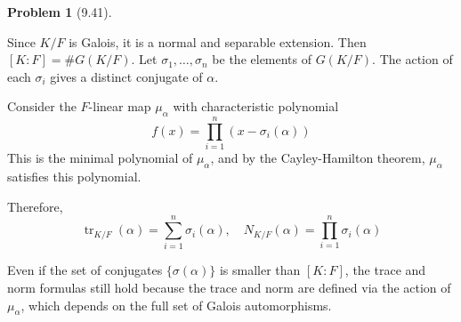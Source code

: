 \documentclass[12pt]{article}
\theoremstyle{definition}
\newtheorem{problem}{Problem}
\DeclareMathOperator{\tr}{tr}
\begin{document}
\begin{problem}[9.41]
\begin{enumerate}[label=(\alph*)]
        \begin{solution}
            Since $K/F$ is Galois, it is a normal and separable extension. Then $[K : F] = \#G(K/F)$. Let $\sigma_1, \dots, \sigma_n$ be the elements of $G(K/F)$. The action of each $\sigma_i$ gives a distinct conjugate of $\alpha$.

            Consider the $F$-linear map $\mu_\alpha$ with characteristic polynomial
            \[
                f(x) = \prod_{i=1}^{n} (x - \sigma_i(\alpha))
            \]
            This is the minimal polynomial of $\mu_\alpha$, and by the Cayley-Hamilton theorem, $\mu_\alpha$ satisfies this polynomial.

            Therefore,
            \[
                \tr_{K/F}(\alpha) = \sum_{i=1}^n \sigma_i(\alpha), \quad N_{K/F}(\alpha) = \prod_{i=1}^n \sigma_i(\alpha)
            \]

            Even if the set of conjugates $\{ \sigma(\alpha) \}$ is smaller than $[K:F]$, the trace and norm formulas still hold because the trace and norm are defined via the action of $\mu_\alpha$, which depends on the full set of Galois automorphisms.
        \end{solution}
    \end{enumerate}
\end{problem}
\end{document}
